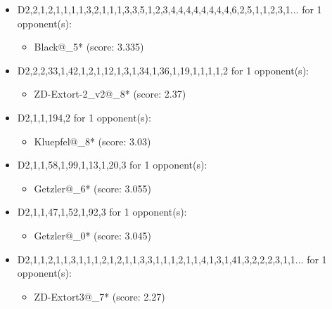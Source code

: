 \begin{appendices}
\begin{itemize}
    \item D2,2,1,2,1,1,1,1,3,2,1,1,1,3,3,5,1,2,3,4,4,4,4,4,4,4,4,6,2,5,1,1,2,3,1... for 1 opponent(s):
    \begin{multicols}{3}
         \begin{itemize}
            \item Black@\_5* (score: 3.335)
        \end{itemize}
     \end{multicols}
     
    \item D2,2,2,33,1,42,1,2,1,12,1,3,1,34,1,36,1,19,1,1,1,1,2 for 1 opponent(s):
    \begin{multicols}{3}
         \begin{itemize}
            \item ZD-Extort-2\_v2@\_8* (score: 2.37)
        \end{itemize}
     \end{multicols}
     
    \item D2,1,1,194,2 for 1 opponent(s):
    \begin{multicols}{3}
         \begin{itemize}
            \item Kluepfel@\_8* (score: 3.03)
        \end{itemize}
     \end{multicols}
     
    \item D2,1,1,58,1,99,1,13,1,20,3 for 1 opponent(s):
    \begin{multicols}{3}
         \begin{itemize}
            \item Getzler@\_6* (score: 3.055)
        \end{itemize}
     \end{multicols}
     
    \item D2,1,1,47,1,52,1,92,3 for 1 opponent(s):
    \begin{multicols}{3}
         \begin{itemize}
            \item Getzler@\_0* (score: 3.045)
        \end{itemize}
     \end{multicols}
     
    \item D2,1,1,2,1,1,3,1,1,1,2,1,2,1,1,3,3,1,1,1,2,1,1,4,1,3,1,41,3,2,2,2,3,1,1... for 1 opponent(s):
    \begin{multicols}{3}
         \begin{itemize}
            \item ZD-Extort3@\_7* (score: 2.27)
        \end{itemize}
     \end{multicols}
     

\end{itemize}
\end{appendices}
